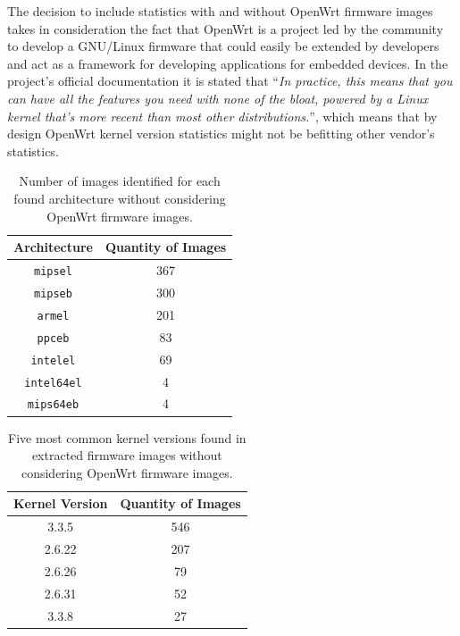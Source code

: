 The decision to include statistics with and without OpenWrt firmware images takes in consideration the fact that OpenWrt is a project led by the community to develop a GNU/Linux firmware that could easily be extended by developers and act as a framework for developing applications for embedded devices. In the project's official documentation it is stated that ``\textit{In practice, this means that you can have all the features you need with none of the bloat, powered by a Linux kernel that's more recent than most other distributions.}'', which means that by design OpenWrt kernel version statistics might not be befitting other vendor's statistics.

\begin{table}[h]
\centering
\caption{Number of images identified for each found architecture without considering OpenWrt firmware images.}
\begin{tabular}{cc}
\hline
\textbf{Architecture}       & \textbf{Quantity of Images} \\ \hline
{\tt mipsel}                &  367                        \\ 
{\tt mipseb}                &  300                        \\ 
{\tt armel}                 &  201                        \\ 
{\tt ppceb}                 &   83                        \\ 
{\tt intelel}               &   69                        \\ 
{\tt intel64el}             &    4                        \\ 
{\tt mips64eb}              &    4                        \\ \hline
\end{tabular}
\label{tab:arch-stats}
\end{table}

\begin{table}[h]
\centering
\caption{Five most common kernel versions found in extracted firmware images without considering OpenWrt firmware images.}
\begin{tabular}{cc}
\hline
\textbf{Kernel Version} & \textbf{Quantity of Images} \\ \hline
3.3.5                  & 546                 \\
2.6.22                 & 207                 \\
2.6.26                 &  79                 \\
2.6.31                 &  52                 \\
3.3.8                  &  27                 \\ \hline
\end{tabular}
\label{tab:kernel-stats}
\end{table}


